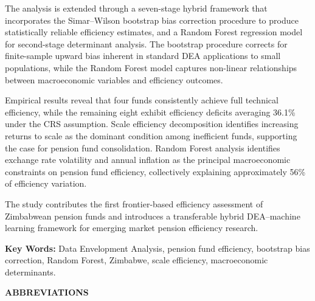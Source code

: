 \documentclass[12pt,a4paper]{article}
\begin{document}
The analysis is extended through a seven-stage hybrid framework that incorporates the Simar--Wilson bootstrap bias correction procedure to produce statistically reliable efficiency estimates, and a Random Forest regression model for second-stage determinant analysis. The bootstrap procedure corrects for finite-sample upward bias inherent in standard DEA applications to small populations, while the Random Forest model captures non-linear relationships between macroeconomic variables and efficiency outcomes.

Empirical results reveal that four funds consistently achieve full technical efficiency, while the remaining eight exhibit efficiency deficits averaging 36.1\% under the CRS assumption. Scale efficiency decomposition identifies increasing returns to scale as the dominant condition among inefficient funds, supporting the case for pension fund consolidation. Random Forest analysis identifies exchange rate volatility and annual inflation as the principal macroeconomic constraints on pension fund efficiency, collectively explaining approximately 56\% of efficiency variation.

The study contributes the first frontier-based efficiency assessment of Zimbabwean pension funds and introduces a transferable hybrid DEA--machine learning framework for emerging market pension efficiency research.

\vspace{1cm}
\noindent\textbf{Key Words:} Data Envelopment Analysis, pension fund efficiency, bootstrap bias correction, Random Forest, Zimbabwe, scale efficiency, macroeconomic determinants.

\newpage

\begin{center}
    {\LARGE\bfseries ABBREVIATIONS}
\end{center}
\vspace{1cm}
\end{document}
